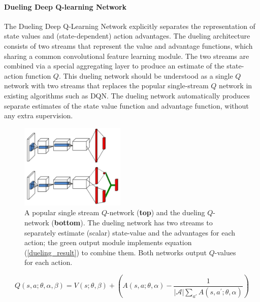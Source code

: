 \paragraph{Dueling Deep Q-learning Network} The Dueling Deep Q-Learning Network \cite{wang2015dueling} explicitly separates the representation of state values and (state-dependent) action advantages. The dueling architecture consists of two streams that represent the value and advantage functions, which sharing a common convolutional feature learning module. The two streams are combined via a special aggregating layer to produce an estimate of the state-action function $Q$. This dueling network should be understood as a single $Q$ network with two streams that replaces the popular single-stream $Q$ network in existing algorithms such as DQN. The dueling network automatically produces separate estimates of the state value function and advantage function, without any extra supervision.
\begin{figure}[h]
\centering
\includegraphics[width=5cm]{pic/dueling-architecture.PNG}
\caption{A popular single stream $Q$-network (\textbf{top}) and the dueling $Q$-network (\textbf{bottom}). The dueling network has two streams to separately estimate (scalar) state-value and the advantages for each action; the green output module implements equation (\ref{dueling_result}) to combine them. Both networks output $Q$-values for each action.} 

\end{figure}
\begin{equation} \label{dueling_result}
Q(s, a; \theta, \alpha, \beta) = V(s; \theta, \beta) + \left(A(s,a;\theta,\alpha) - \frac{1}{|\mathcal{A}|\sum_{a'}{}A(s,a^{'};\theta, \alpha)}\right)
\end{equation}
